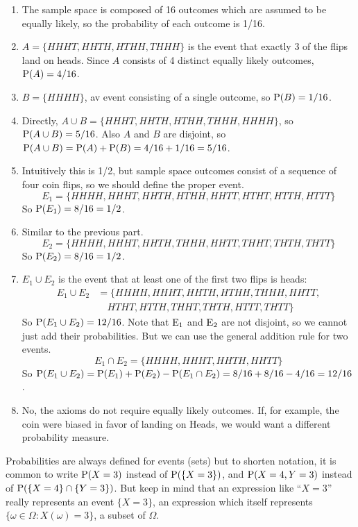 \documentclass[
]{book}
\providecommand{\tightlist}{%
  \setlength{\itemsep}{0pt}\setlength{\parskip}{0pt}}
\theoremstyle{definition}
\theoremstyle{definition}
\theoremstyle{definition}
\theoremstyle{remark}
\begin{document}
\begin{enumerate}
\def\labelenumi{\arabic{enumi}.}
\tightlist
\item
  The sample space is composed of 16 outcomes which are assumed to be equally likely, so the probability of each outcome is 1/16.
\item
  \(A = \{HHHT, HHTH, HTHH, THHH\}\) is the event that exactly 3 of the flips land on heads. Since \(A\) consists of 4 distinct equally likely outcomes, \(\textrm{P}(A) = 4/16\).
\item
  \(B = \{HHHH\}\), av event consisting of a single outcome, so \(\textrm{P}(B) = 1/16\).
\item
  Directly, \(A \cup B = \{HHHT, HHTH, HTHH, THHH, HHHH\}\), so \(\textrm{P}(A\cup B) = 5/16\). Also \(A\) and \(B\) are disjoint, so \(\textrm{P}(A \cup B) = \textrm{P}(A) + \textrm{P}(B) = 4/16 + 1/16 = 5/16\).
\item
  Intuitively this is 1/2, but sample space outcomes consist of a sequence of four coin flips, so we should define the proper event.
  \[
  E_1 = \{HHHH, HHHT, HHTH, HTHH, HHTT, HTHT, HTTH, HTTT\}
  \]
  So \(\textrm{P}(E_1) = 8/16 = 1/2\).
\item
  Similar to the previous part.
  \[
  E_2 = \{HHHH, HHHT, HHTH, THHH, HHTT, THHT, THTH, THTT\}
  \]
  So \(\textrm{P}(E_2) = 8/16 = 1/2\).
\item
  \(E_1 \cup E_2\) is the event that at least one of the first two flips is heads:
  \begin{align*}
  E_1 \cup E_2 & = \{HHHH, HHHT, HHTH, HTHH, THHH, HHTT,
  \\
  & \quad HTHT, HTTH, THHT, THTH, HTTT, THTT\}
  \end{align*}
  So \(\textrm{P}(E_1 \cup E_2) = 12/16\). Note that \(\textrm{E}_1\) and \(\textrm{E}_2\) are not disjoint, so we cannot just add their probabilities. But we can use the general addition rule for two events.
  \[
  E_1 \cap E_2 = \{HHHH, HHHT, HHTH, HHTT\}
  \]
  So \(\textrm{P}(E_1 \cup E_2) = \textrm{P}(E_1) + \textrm{P}(E_2) - \textrm{P}(E_1 \cap E_2) = 8/16 + 8/16 - 4/16 = 12/16\).
\item
  No, the axioms do not require equally likely outcomes. If, for example, the coin were biased in favor of landing on Heads, we would want a different probability measure.
\end{enumerate}

Probabilities are always defined for events (sets) but to shorten notation, it is common to write \(\textrm{P}(X=3)\) instead of \(\textrm{P}(\{X=3\})\), and \(\textrm{P}(X = 4, Y = 3)\) instead of \(\textrm{P}(\{X = 4\}\cap \{Y = 3\})\). But keep in mind that an expression like ``\(X=3\)'' really represents an event \(\{X=3\}\), an expression which itself represents \(\{\omega\in\Omega: X(\omega) = 3\}\), a subset of \(\Omega\).
\end{document}

